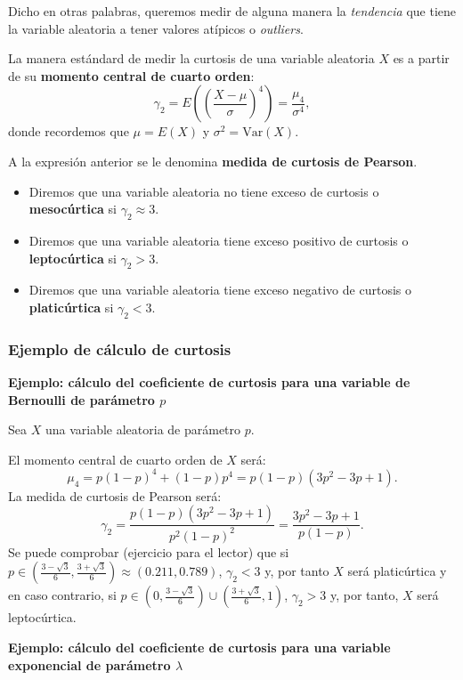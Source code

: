 \documentclass[]{book}
\begin{document}
Dicho en otras palabras, queremos medir de alguna manera la \emph{tendencia} que tiene la variable aleatoria a tener valores atípicos o \emph{outliers}.

La manera estándard de medir la curtosis de una variable aleatoria \(X\) es a partir de su \textbf{momento central de cuarto orden}:
\[
\gamma_2 = E\left(\left(\frac{X-\mu}{\sigma}\right)^4\right) = \frac{\mu_4}{\sigma^4},
\]
donde recordemos que \(\mu=E(X)\) y \(\sigma^2 =\mathrm{Var}(X)\).

A la expresión anterior se le denomina \textbf{medida de curtosis de Pearson}.

\begin{itemize}
\item
  Diremos que una variable aleatoria no tiene exceso de curtosis o \textbf{mesocúrtica} si \(\gamma_2 \approx 3\).
\item
  Diremos que una variable aleatoria tiene exceso positivo de curtosis o \textbf{leptocúrtica} si \(\gamma_2 >3\).
\item
  Diremos que una variable aleatoria tiene exceso negativo de curtosis o \textbf{platicúrtica} si \(\gamma_2 <3\).
\end{itemize}

\hypertarget{ejemplo-de-cuxe1lculo-de-curtosis}{%
\subsubsection{Ejemplo de cálculo de curtosis}\label{ejemplo-de-cuxe1lculo-de-curtosis}}

\textbf{Ejemplo: cálculo del coeficiente de curtosis para una variable de Bernoulli de parámetro \(p\)}

Sea \(X\) una variable aleatoria de parámetro \(p\).

El momento central de cuarto orden de \(X\) será:
\[
\mu_4 = p (1-p)^4 +(1-p)p^4 = p (1-p) (3 p^2-3p+1).
\]
La medida de curtosis de Pearson será:
\[
\gamma_2 = \frac{p (1-p) (3 p^2-3p+1)}{p^2 (1-p)^2} = \frac{3 p^2-3p+1}{p(1-p)}.
\]
Se puede comprobar (ejercicio para el lector) que si \(p\in \left(\frac{3-\sqrt{3}}{6},\frac{3+\sqrt{3}}{6}\right)\approx (0.211,0.789)\), \(\gamma_2 <3\) y, por tanto \(X\) será platicúrtica y en caso contrario, si \(p\in \left(0,\frac{3-\sqrt{3}}{6}\right)\cup \left(\frac{3+\sqrt{3}}{6},1\right)\), \(\gamma_2 >3\) y, por tanto, \(X\) será leptocúrtica.

\textbf{Ejemplo: cálculo del coeficiente de curtosis para una variable exponencial de parámetro \(\lambda\)}
\end{document}
